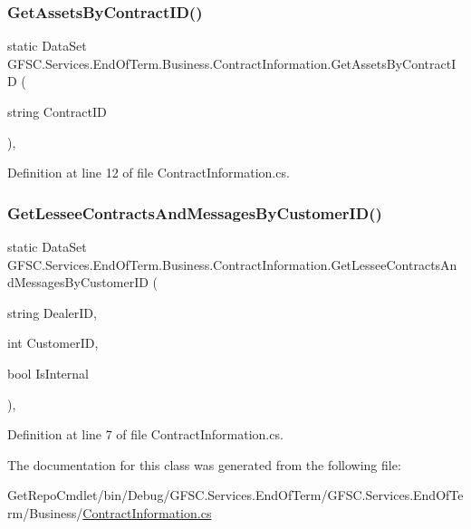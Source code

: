\subsubsection{\texorpdfstring{Get\+Assets\+By\+Contract\+I\+D()}{GetAssetsByContractID()}}
{\footnotesize\ttfamily static Data\+Set G\+F\+S\+C.\+Services.\+End\+Of\+Term.\+Business.\+Contract\+Information.\+Get\+Assets\+By\+Contract\+ID (\begin{DoxyParamCaption}\item[{string}]{Contract\+ID }\end{DoxyParamCaption})\hspace{0.3cm}{\ttfamily [static]}, {\ttfamily [package]}}



Definition at line 12 of file Contract\+Information.\+cs.

\mbox{\label{class_g_f_s_c_1_1_services_1_1_end_of_term_1_1_business_1_1_contract_information_a714358e96fe7331e1c5ed90a79f4afbb}} 
\subsubsection{\texorpdfstring{Get\+Lessee\+Contracts\+And\+Messages\+By\+Customer\+I\+D()}{GetLesseeContractsAndMessagesByCustomerID()}}
{\footnotesize\ttfamily static Data\+Set G\+F\+S\+C.\+Services.\+End\+Of\+Term.\+Business.\+Contract\+Information.\+Get\+Lessee\+Contracts\+And\+Messages\+By\+Customer\+ID (\begin{DoxyParamCaption}\item[{string}]{Dealer\+ID,  }\item[{int}]{Customer\+ID,  }\item[{bool}]{Is\+Internal }\end{DoxyParamCaption})\hspace{0.3cm}{\ttfamily [static]}, {\ttfamily [package]}}



Definition at line 7 of file Contract\+Information.\+cs.



The documentation for this class was generated from the following file\+:\begin{DoxyCompactItemize}
\item 
Get\+Repo\+Cmdlet/bin/\+Debug/\+G\+F\+S\+C.\+Services.\+End\+Of\+Term/\+G\+F\+S\+C.\+Services.\+End\+Of\+Term/\+Business/\mbox{\hyperlink{_business_2_contract_information_8cs}{Contract\+Information.\+cs}}\end{DoxyCompactItemize}
